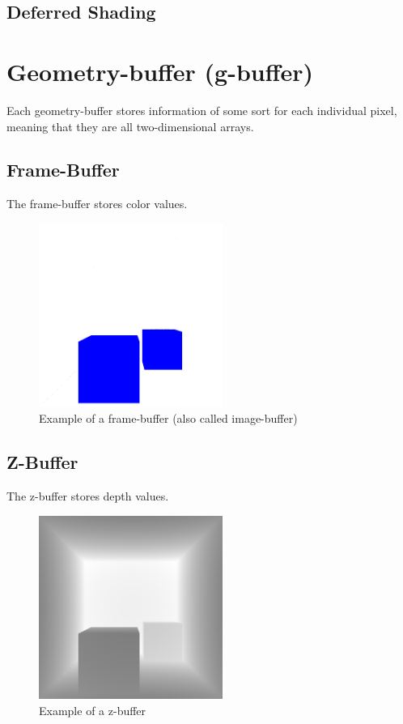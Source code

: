 \documentclass{ACGSeminar}
\begin{document}
	\subsection{Deferred Shading}

\section{Geometry-buffer (g-buffer)}
	Each geometry-buffer stores information of some sort for each individual pixel, meaning that they are all two-dimensional arrays.
	\subsection{Frame-Buffer}%
		The frame-buffer stores color values.%
		\begin{figure}[htb!]%
			\begin{center}%
				\includegraphics[width=6cm]{img/frame_buffer.png}
			\end{center}%
			\caption{Example of a frame-buffer (also called image-buffer)}%
			\label{fig:frame_buffer}%
		\end{figure}%
	\subsection{Z-Buffer}
		The z-buffer stores depth values.
		\begin{figure}[htb!]%
			\begin{center}%
				\includegraphics[width=6cm]{img/z_buffer.png}
			\end{center}%
			\caption{Example of a z-buffer}%
			\label{fig:z_buffer}%
		\end{figure}%
\end{document}
